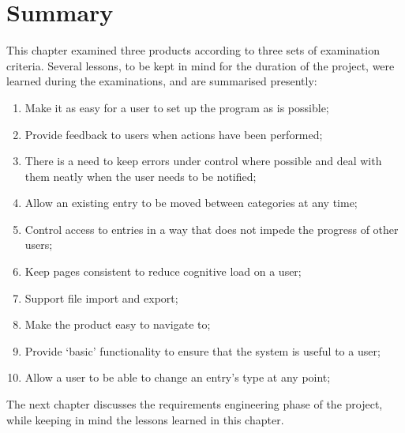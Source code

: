 \section{Summary}
This chapter examined three products according to three sets of examination criteria. Several lessons, to be kept in mind for the duration of the project, were learned during the examinations, and are summarised presently:
\begin{enumerate}
	\item Make it as easy for a user to set up the program as is possible;
	\item Provide feedback to users when actions have been performed;
	\item There is a need to keep errors under control where possible and deal with them neatly when the user needs to be notified;
	\item Allow an existing entry to be moved between categories at any time;
	\item Control access to entries in a way that does not impede the progress of other users;
	\item Keep pages consistent to reduce cognitive load on a user;
	\item Support \bibtex{} file import and export;
	\item Make the product easy to navigate to;
	\item Provide `basic' functionality to ensure that the system is useful to a user;
	\item Allow a user to be able to change an entry's type at any point;
\end{enumerate} 

The next chapter discusses the requirements engineering phase of the project, while keeping in mind the lessons learned in this chapter.